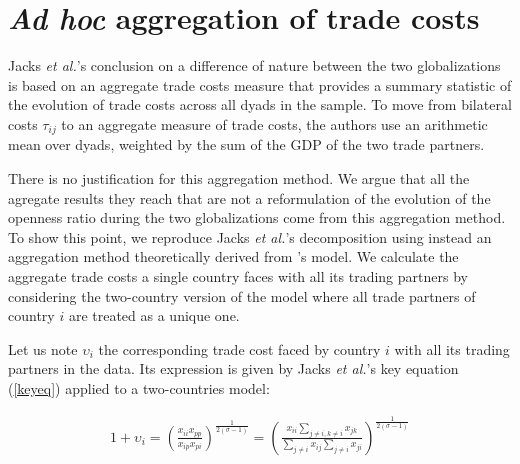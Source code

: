 \documentclass{article}
\begin{document}
\section{\label{2} \textit{Ad hoc} aggregation of trade costs}

Jacks \textit{et al.}'s conclusion on a difference of nature between the
two globalizations is based on an aggregate trade costs
measure that provides a summary statistic of the
evolution of trade costs across all dyads in the sample. To move from
bilateral costs $\tau_{ij}$ to an aggregate measure of trade
costs, the authors use an arithmetic mean over dyads, weighted
by the sum of the GDP of the two trade partners.

There is no justification for this aggregation method. We argue that
all the agregate results they reach that are not a reformulation of the
evolution of the openness ratio during the two
globalizations come from this aggregation method.\\

To show this point, we reproduce Jacks \emph{et al.}'s decomposition using instead an aggregation method theoretically derived from \cite{AW2003}'s model. We calculate the aggregate trade costs a single country faces with all its trading partners by considering the two-country version of the model where all trade partners of country $i$ are treated as a unique one.




Let us note $\upsilon_{i}$ the corresponding trade cost faced by country $i$ with all its trading partners in the data. Its expression is given by Jacks \textit{et al.}'s key equation (\ref{keyeq}) applied to a two-countries model:

\begin{eqnarray}
1+\upsilon_{i}= \left(\frac{x_{ii} x_{pp}}{x_{ip}
x_{pi}}\right)^{\frac{1}{2(\sigma-1)}}
=\left(\frac{x_{ii} \sum_{j \neq i, k \neq i } x_{jk}}{\sum_{j \neq i } x_{ij}\sum_{j \neq i} x_{ji}}\right)^{\frac{1}{2(\sigma-1)}}   \label{keyeq2model}
\end{eqnarray}
\end{document}
